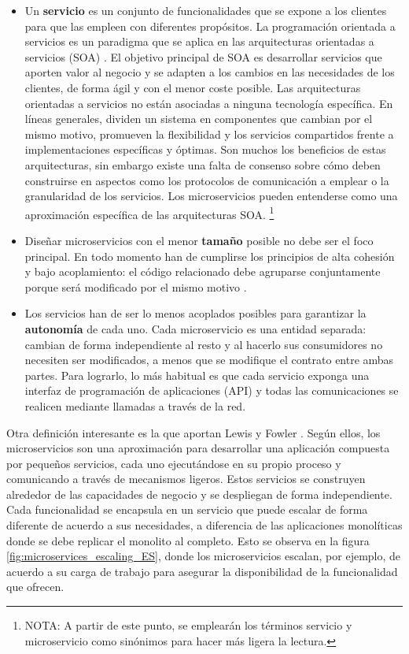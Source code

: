 \documentclass[11pt,spanish,listoffigures]{tfgetsinf}
\begin{document}
\begin{itemize}

\item Un \textbf{servicio} es un conjunto de funcionalidades que se expone a los clientes para que las empleen con diferentes propósitos. La programación orientada a servicios es un paradigma que se aplica en las arquitecturas orientadas a servicios (SOA) \cite{Arsanjani2009a}. El objetivo principal de SOA es desarrollar servicios que aporten valor al negocio y se adapten a los cambios en las necesidades de los clientes, de forma ágil y con el menor coste posible. Las arquitecturas orientadas a servicios no están asociadas a ninguna tecnología específica. En líneas generales, dividen un sistema en componentes que cambian por el mismo motivo, promueven la flexibilidad y los servicios compartidos frente a implementaciones específicas y óptimas. Son muchos los beneficios de estas arquitecturas, sin embargo existe una falta de consenso sobre cómo deben construirse en aspectos como los protocolos de comunicación a emplear o la granularidad de los servicios. Los microservicios pueden entenderse como una aproximación específica de las arquitecturas SOA. \footnote{ NOTA: A partir de este punto, se emplearán los términos servicio y microservicio como sinónimos para hacer más ligera la lectura.}

\item Diseñar microservicios con el menor \textbf{tamaño} posible no debe ser el foco principal. En todo momento han de cumplirse los principios de alta cohesión y bajo acoplamiento: el código relacionado debe agruparse conjuntamente porque será modificado por el mismo motivo \cite{Newman2015a}.

\item  Los servicios han de ser lo menos acoplados posibles para garantizar la \textbf{autonomía} de cada uno. Cada microservicio es una entidad separada: cambian de forma independiente al resto y al hacerlo sus consumidores no necesiten ser modificados, a menos que se modifique el contrato entre ambas partes. Para lograrlo, lo más habitual es que cada servicio exponga una interfaz de programación de aplicaciones (API) y todas las comunicaciones se realicen mediante llamadas a través de la red\cite{Newman2015a, Hunter2017}.

\end{itemize}

Otra definición interesante es la que aportan Lewis y Fowler \cite{Lewis2014}. Según ellos, los microservicios son una aproximación para desarrollar una aplicación compuesta por pequeños servicios, cada uno ejecutándose en su propio proceso y comunicando a través de mecanismos ligeros. Estos servicios se construyen alrededor de las capacidades de negocio y se despliegan de forma independiente. Cada funcionalidad se encapsula en un servicio que puede escalar de forma diferente de acuerdo a sus necesidades, a diferencia de las aplicaciones monolíticas donde se debe replicar el monolito al completo. Esto se observa en la figura \ref{fig:microservices_escaling_ES}, donde los microservicios escalan, por ejemplo, de acuerdo a su carga de trabajo para asegurar la disponibilidad de la funcionalidad que ofrecen.
\end{document}
